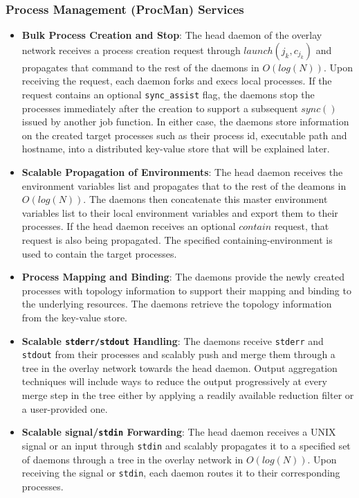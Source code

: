 \documentclass[10pt]{article}
\begin{document}
\subsubsection{Process Management (ProcMan) Services}
\label{sect:procman}

\begin{itemize}
\item{{\bf Bulk Process Creation and Stop}: The head daemon of the overlay network
receives a process creation request 
through $launch(j_k, c_{j_k})$ and propagates that command to the rest of the daemons 
in $O(log(N))$. Upon receiving the request, each daemon forks and execs 
local processes. If the request contains an optional {\tt sync\_assist} flag, the daemons
stop the processes immediately after the creation to support a subsequent $sync()$ issued 
by another job function. In either case, the daemons store
information on the created target processes such as their process id, executable path
and hostname, into a distributed key-value store that will be explained later.}

\item{{\bf Scalable Propagation of Environments}: The head daemon receives the environment
variables list and propagates that to the rest of the deamons
in $O(log(N))$. The daemons then concatenate this master environment variables
list to their local environment variables and export them to their
processes. If the head daemon receives an optional $contain$ request, that
request is also being propagated. The specified containing-environment is used to contain
the target processes.} 

\item{{\bf Process Mapping and Binding}: The daemons provide the newly created processes 
with topology information to support their mapping and binding to the underlying 
resources. The daemons retrieve the topology information from the key-value store.} 

\item{{\bf Scalable {\tt stderr/stdout} Handling}: The daemons receive 
{\tt stderr} and {\tt stdout} 
from their processes and scalably push and merge them through a tree in the overlay
network towards the head daemon. Output aggregation techniques
will include ways to reduce the output progressively at every merge step 
in the tree either by applying a readily available 
reduction filter or a user-provided one.} 

\item{{\bf Scalable signal/{\tt stdin} Forwarding}: The head daemon receives a UNIX signal
or an input through {\tt stdin} and scalably propagates it to a specified set of daemons 
through a tree in the overlay network in $O(log(N))$. Upon receiving the signal or {\tt stdin}, 
each daemon routes it to their corresponding processes.}


\end{itemize}
\end{document}
